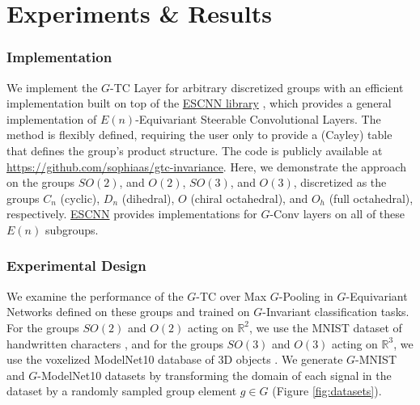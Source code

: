 \section{Experiments \& Results}


\subsubsection*{Implementation}

We implement the $G$-TC Layer for arbitrary discretized groups with an efficient implementation built on top of the \href{https://github.com/QUVA-Lab/escnn}{ESCNN library} \cite{cesa2022a, e2cnn}, which provides a general implementation of $E(n)$-Equivariant Steerable Convolutional Layers. The method is flexibly defined, requiring the user only to provide a (Cayley) table that defines the group's product structure. The code is publicly available at \url{https://github.com/sophiaas/gtc-invariance}. Here, we demonstrate the approach on the groups $SO(2)$, and $O(2)$, $SO(3)$, and $O(3)$, discretized as the groups $C_n$ (cyclic), $D_n$ (dihedral), $O$ (chiral octahedral), and $O_h$ (full octahedral), respectively. \href{https://github.com/QUVA-Lab/escnn}{ESCNN} provides implementations for $G$-Conv layers on all of these $E(n)$ subgroups.



\subsubsection*{Experimental Design}

We examine the performance of the $G$-TC over Max $G$-Pooling in $G$-Equivariant Networks defined on these groups and trained on $G$-Invariant classification tasks. For the groups $SO(2)$ and $O(2)$ acting on $\mathbb{R}^2$, we use the MNIST dataset of handwritten characters \cite{lecun1998mnist}, and for the groups $SO(3)$ and $O(3)$ acting on $\mathbb{R}^3$, we use the voxelized ModelNet10 database of 3D objects \cite{wu20153d}. We generate $G$-MNIST and $G$-ModelNet10 datasets by transforming the domain of each signal in the dataset by a randomly sampled group element $g \in G$ (Figure \ref{fig:datasets}).


